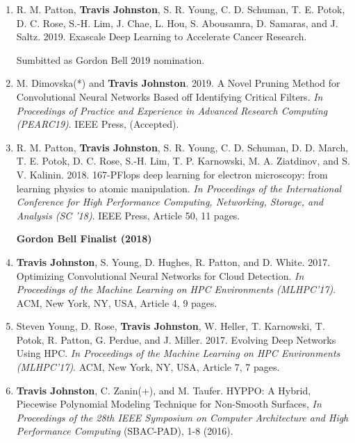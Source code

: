\documentclass{article}
\begin{document}
	\begin{enumerate}[1.]
        \item R. M. Patton, \textbf{Travis Johnston}, S. R. Young, C. D. Schuman, T. E. Potok,
        D. C. Rose, S.-H. Lim, J. Chae, L. Hou, S. Abousamra, D. Samaras, and J. Saltz.  2019.
        Exascale Deep Learning to Accelerate Cancer Research.

        Sumbitted as Gordon Bell 2019 nomination.

        \item M. Dimovska(*) and \textbf{Travis Johnston}. 2019.
        A Novel Pruning Method for Convolutional Neural Networks Based off Identifying
        Critical Filters.
        \textit{In Proceedings of Practice and Experience in Advanced Research Computing (PEARC19)}.
        IEEE Press, (Accepted).

        \item R. M. Patton, \textbf{Travis Johnston}, S. R. Young, C. D. Schuman, D. D. March,
        T. E. Potok, D. C. Rose, S.-H. Lim, T. P. Karnowski, M. A. Ziatdinov, and 
        S. V. Kalinin. 2018.
        167-PFlops deep learning for electron microscopy: 
        from learning physics to atomic manipulation. 
        \textit{In Proceedings of the International Conference for High Performance Computing,
        Networking, Storage, and Analysis (SC '18)}. IEEE Press, Article 50, 11 pages.

        \textbf{Gordon Bell Finalist (2018)}

		\item \textbf{Travis Johnston}, S. Young, D. Hughes, R. Patton, and D. White. 2017.
		Optimizing Convolutional Neural Networks for Cloud Detection.  
        \textit{In Proceedings of the Machine Learning on HPC Environments (MLHPC'17)}. ACM, New York, NY, USA, Article 4, 9 pages.

        \item Steven Young, D. Rose, \textbf{Travis Johnston}, W. Heller, T. Karnowski, T. Potok, R. Patton, G. Perdue, and J. Miller. 2017.
        Evolving Deep Networks Using HPC.
        \textit{In Proceedings of the Machine Learning on HPC Environments (MLHPC'17)}. ACM, New York, NY, USA, Article 7, 7 pages.

	
		\item \textbf{Travis Johnston}, C. Zanin(+), and M. Taufer.  HYPPO: A Hybrid, Piecewise Polynomial Modeling Technique for Non-Smooth Surfaces,
		\textit{In Proceedings of the 28th IEEE Symposium on Computer Architecture and High Performance Computing} (SBAC-PAD), 1-8 (2016).
		

\end{enumerate}
\end{document}
